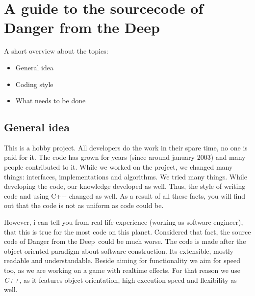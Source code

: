 \documentclass{report}
\begin{document}
\tableofcontents

\newcommand{\dftd}{\textsf{Danger from the Deep}\ }



\chapter{A guide to the sourcecode of \dftd}

A short overview about the topics:
\begin{itemize}
\item General idea
\item Coding style
\item What needs to be done
\end{itemize}

\section{General idea}

This is a hobby project. All developers do the work in their spare time,
no one is paid for it. The code has grown for years (since around
january 2003) and many people contributed to it. While we worked on the
project, we changed many things: interfaces, implementations and
algorithms. We tried many things. While developing the code, our
knowledge developed as well. Thus, the style of writing code and using
C++ changed as well. As a result of all these facts, you will find out
that the code is not as uniform as code could be.

However, i can tell you from real life experience (working as software
engineer), that this is true for the most code on this planet.
Considered that fact, the source code of \dftd could be much worse. The
code is made after the object oriented paradigm about software
construction. Its extensible, mostly readable and understandable. Beside
aiming for functionality we aim for speed too, as we are working on a
game with realtime effects.  For that reason we use \emph{C++}, as it
features object orientation, high execution speed and flexibility as
well.
\end{document}
